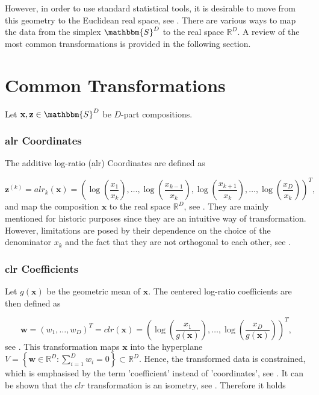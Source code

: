However, in order to use standard statistical tools, it is desirable to move from this geometry to the Euclidean real space, see \textcite{Filzmoser:2020}. There are various ways to map the data from the simplex $\mathbbm{S}^D$ to the real space $\mathbb{R}^D$. A review of the most common transformations is provided in the following section.

\section{Common Transformations}
\label{sec: Common Transformations}

Let $\textbf{x}, \textbf{z} \in \mathbbm{S}^D$ be $D$-part compositions.
\subsubsection{alr Coordinates}
\label{sec:alr Coordinates}

The additive log-ratio (alr) Coordinates are defined as

\begin{equation}
\textbf{z}^{(k)} = alr_k(\textbf{x}) = \left(\log\left(\frac{x_1}{x_k}\right), \ldots, \log\left(\frac{x_{k-1}}{x_k}\right),\log\left(\frac{x_{k+1}}{x_k}\right),\ldots,\log\left(\frac{x_D}{x_k}\right)\right)^T,
\label{eq:alr Coordinates}
\end{equation}
%
and map the composition $\textbf{x}$ to the real space $\mathbb{R}^D$, see \textcite{Kynclova:2015}. They are mainly mentioned for historic purposes since they are an intuitive way of transformation. However, limitations are posed by their dependence on the choice of the denominator $x_k$ and the fact that they are not orthogonal to each other, see \textcite{Filzmoser:2020}. 

\subsubsection{clr Coefficients}
\label{sec:clr Coefficients}

Let $g(\textbf{x})$ be the geometric mean of $\textbf{x}$. The centered log-ratio coefficients are then defined as

\begin{equation}
\textbf{w} = (w_1,\ldots, w_D)^T = clr(\textbf{x}) = \left(\log\left(\frac{x_1}{g(\textbf{x})}\right),\ldots, \log\left(\frac{x_D}{g(\textbf{x})}\right)\right)^T,
\label{eq:clr Coefficients}
\end{equation}
%
see \textcite{Kynclova:2015}. This transformation maps $\textbf{x}$ into the hyperplane $V = \left\{\textbf{w} \in \mathbb{R}^D: \sum_{i=1}^D w_i=0\right\} \subset \mathbb{R}^D$. Hence, the transformed data is constrained, which is emphasised by the term 'coefficient' instead of 'coordinates', see \textcite{Filzmoser:2020}. It can be shown that the $clr$ transformation is an isometry, see \textcite{Egozcue:2003}. Therefore it holds 

